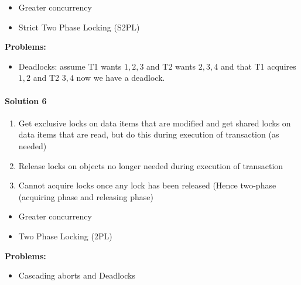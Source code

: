 \begin{itemize}
\item Greater concurrency
\item Strict Two Phase Locking (S2PL)
\end{itemize}

\textbf{{\color{red} Problems:}}
\begin{itemize}
\item Deadlocks: assume T1 wants $1,2,3$ and T2 wants $2,3,4$
  and that T1 acquires $1,2$ and T2 $3,4$ now we have a deadlock.
\end{itemize}


\paragraph{Solution 6}
\begin{enumerate}
\item Get exclusive locks on data items that are modified and get
  shared locks on data items that are read, but do this during execution
  of transaction (as needed)
\item Release locks on objects no longer needed during execution
  of transaction
\item Cannot acquire locks once any lock has been released
  (Hence two-phase (acquiring phase and releasing phase)
\end{enumerate}

\begin{itemize}
\item Greater concurrency
\item Two Phase Locking (2PL)
\end{itemize}

\textbf{{\color{red} Problems:}}
\begin{itemize}
\item Cascading aborts and Deadlocks
\end{itemize}


